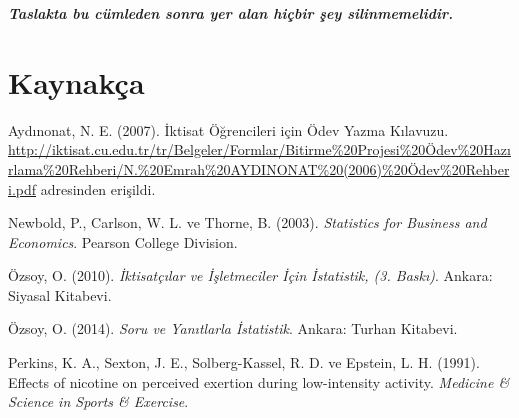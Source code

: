 \documentclass[
  12pt,
]{article}
\newlength{\cslhangindent}
\newlength{\cslentryspacingunit} %
\newenvironment{CSLReferences}[2] %
 {%
  \setlength{\parindent}{0pt}
  \ifodd #1
  \let\oldpar\par
  \def\par{\hangindent=\cslhangindent\oldpar}
  \fi
  \setlength{\parskip}{#2\cslentryspacingunit}
 }%
 {}
\begin{document}
\textbf{\emph{Taslakta bu cümleden sonra yer alan hiçbir şey silinmemelidir.}}

\newpage

\hypertarget{references}{%
\section{Kaynakça}\label{references}}

\hypertarget{refs}{}
\begin{CSLReferences}{1}{0}
\leavevmode{}%
Aydınonat, N. E. (2007). İktisat Öğrencileri için Ödev Yazma Kılavuzu. \url{http://iktisat.cu.edu.tr/tr/Belgeler/Formlar/Bitirme\%20Projesi\%20Ödev\%20Hazırlama\%20Rehberi/N.\%20Emrah\%20AYDINONAT\%20(2006)\%20Ödev\%20Rehberi.pdf} adresinden erişildi.

\leavevmode{}%
Newbold, P., Carlson, W. L. ve Thorne, B. (2003). \emph{Statistics for Business and Economics}. Pearson College Division.

\leavevmode{}%
Özsoy, O. (2010). \emph{İktisat{ç}{ı}lar ve İ{ş}letmeciler İ{ç}in İstatistik, (3. Bask{ı})}. Ankara: Siyasal Kitabevi.

\leavevmode{}%
Özsoy, O. (2014). \emph{Soru ve Yanıtlarla İstatistik}. Ankara: Turhan Kitabevi.

\leavevmode{}%
Perkins, K. A., Sexton, J. E., Solberg-Kassel, R. D. ve Epstein, L. H. (1991). Effects of nicotine on perceived exertion during low-intensity activity. \emph{Medicine \& Science in Sports \& Exercise}.

\end{CSLReferences}
\end{document}
